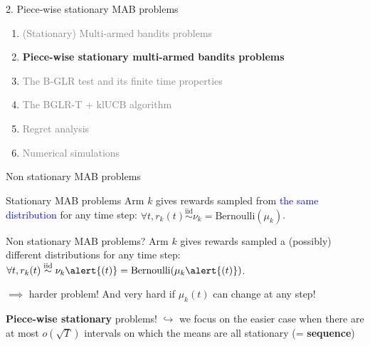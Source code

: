\documentclass[11pt,english,ignorenonframetext,]{beamer}
\begin{document}
\begin{frame}{2. Piece-wise stationary MAB problems}

  \begin{enumerate}
    \item
    \textcolor{gray}{
      (Stationary) Multi-armed bandits problems
    }
    \vspace*{15pt}

    \item
    \alert{\textbf{%
      Piece-wise stationary multi-armed bandits problems
    }}
    \vspace*{15pt}

    \item
    \textcolor{gray}{
      The B-GLR test and its finite time properties
    }
    \vspace*{15pt}

    \item
    \textcolor{gray}{
      The BGLR-T + klUCB algorithm
    }
    \vspace*{15pt}

    \item
    \textcolor{gray}{
      Regret analysis
    }
    \vspace*{15pt}

    \item
    \textcolor{gray}{
      Numerical simulations
    }
  \end{enumerate}

\end{frame}


\begin{frame}{Non stationary MAB problems}

  \begin{block}{Stationary MAB problems}
    Arm $k$ gives rewards sampled from \textcolor{blue}{the same distribution} for any time step:
    $\forall t, r_k(t) \overset{\text{iid}}{\sim} \nu_k = \mathrm{Bernoulli}(\mu_k)$.
  \end{block}

  \pause
  \begin{alertblock}{Non stationary MAB problems?}
    Arm $k$ gives rewards sampled a \alert{(possibly) different distributions} for any time step:
    $\forall t, r_k(t) \overset{\text{iid}}{\sim} \nu_k\alert{(t)} = \mathrm{Bernoulli}(\mu_k\alert{(t)})$.
  \end{alertblock}

  $\implies$ harder problem!
  And very hard if $\mu_k(t)$ can change at any step!

  \pause
  \begin{block}{\textbf{Piece-wise stationary} problems!}
    $\hookrightarrow$ we focus on the easier case when there are at most $o(\sqrt{T})$ intervals on which the means are all stationary (= \textbf{sequence})
  \end{block}
\end{frame}
\end{document}
